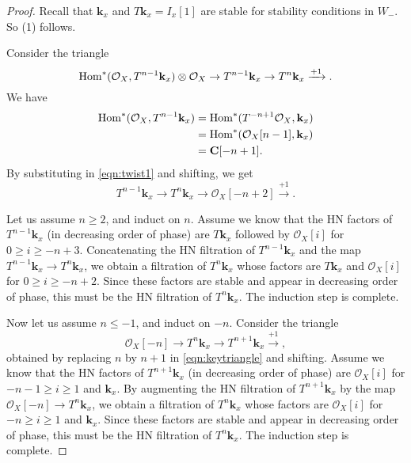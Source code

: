 \documentclass{amsart}
\begin{document}
\begin{proof}
  Recall that \(\mathbf{k}_x\) and \(T \mathbf{k}_x = I_x[1]\) are stable for stability conditions in \(W_-\).
  So (1) follows.

  Consider the triangle
  \begin{equation}\label{eqn:twist1}
    \operatorname{Hom}^{*}(\mathcal{O}_X, T^{n-1} \mathbf{k}_x) \otimes \mathcal{O}_X \to T^{n-1} \mathbf{k}_x \to T^n \mathbf{k}_x \xrightarrow{+1}.
  \end{equation}
  We have
  \begin{align*}
    \operatorname{Hom}^{*}(\mathcal{O}_X, T^{n-1} \mathbf{k}_x) &= \operatorname{Hom}^{*}(T^{-n+1} \mathcal{O}_{X}, \mathbf{k}_x)\\
                                                  &= \operatorname{Hom}^{*}(\mathcal{O}_X[n-1], \mathbf{k}_x) \\
    &= \mathbf{C}[-n+1].
  \end{align*}
  By substituting in \eqref{eqn:twist1} and shifting, we get
  \begin{equation}\label{eqn:keytriangle}
    T^{n-1}\mathbf{k}_x \to T^n \mathbf{k}_x \to \mathcal{O}_{X} [-n+2] \xrightarrow{+1}.
  \end{equation}

  Let us assume \(n \geq 2\), and induct on \(n\).
  Assume we know that the HN factors of \(T^{n-1} \mathbf{k}_x\) (in decreasing order of phase) are \(T\mathbf{k}_{x}\) followed by \(\mathcal{O}_X[i]\) for \(0 \geq i \geq -n+3\).
  Concatenating the HN filtration of \(T^{n-1} \mathbf{k}_x\) and the map \(T^{n-1}\mathbf{k}_x \to T^n \mathbf{k}_x\), we obtain a filtration of \(T^n \mathbf{k}_x\) whose factors are \(T \mathbf{k}_x\) and \(\mathcal{O}_X[i]\) for \(0 \geq i \geq -n+2\).
  Since these factors are stable and appear in decreasing order of phase, this must be the HN filtration of \(T^n \mathbf{k}_x\).
  The induction step is complete.

  Now let us assume \(n \leq -1\), and induct on \(-n\).
  Consider the triangle
  \begin{equation}\label{eqn:keytriangle2}
    \mathcal{O}_{X} [-n] \to T^{n}\mathbf{k}_x \to T^{n+1} \mathbf{k}_x \xrightarrow{+1},
  \end{equation}
  obtained by replacing \(n\) by \(n+1\) in \eqref{eqn:keytriangle} and shifting.
  Assume we know that the HN factors of \(T^{n+1} \mathbf{k}_x\) (in decreasing order of phase) are \(\mathcal{O}_X[i]\) for \(-n-1 \geq i \geq 1\) and \(\mathbf{k}_x\).
  By augmenting the HN filtration of \(T^{n+1} \mathbf{k}_x\) by the map \(\mathcal{O}_X[-n] \to T^n \mathbf{k}_x\), we obtain a filtration of \(T^n \mathbf{k}_x\) whose factors are \(\mathcal{O}_X[i]\) for \(-n \geq i \geq 1\) and \(\mathbf{k}_x\).
  Since these factors are stable and appear in decreasing order of phase, this must be the HN filtration of \(T^n \mathbf{k}_x\).
   The induction step is complete.
 \end{proof}
\end{document}
